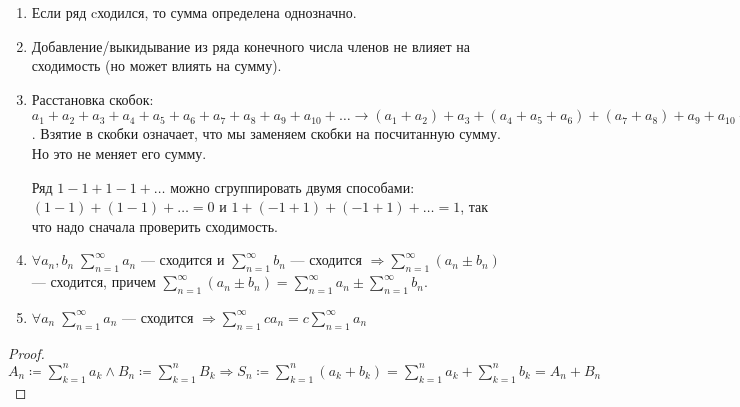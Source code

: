 \begin{enumerate}
    \item Если ряд cходился, то сумма определена однозначно.
    \item Добавление/выкидывание из ряда конечного числа членов не влияет на сходимость (но может влиять на сумму).
    \item Расстановка скобок: $a_1 + a_2 + a_3 + a_4 + a_5 + a_6 + a_7 + a_8 + a_9 + a_{10} + \ldots \to (a_1 + a_2) + a_3 + (a_4 + a_5 + a_6) + (a_7 + a_8) + a_9 + a_{10} + \ldots$. Взятие в скобки означает, что мы заменяем скобки на посчитанную сумму. Но это не меняет его сумму.
        \begin{remark}
            Ряд $1 -1 + 1 - 1 + \ldots$ можно сгруппировать двумя способами: $(1 - 1) + (1 - 1) + \ldots = 0$ и $1 + (-1 + 1) + (-1 + 1) + \ldots = 1$, так что надо сначала проверить сходимость.
        \end{remark}
    \item $\forall a_n, b_n \; \sum_{n=1}^\infty a_n$ --- сходится и $\sum_{n=1}^\infty b_n$ --- сходится $\Rightarrow \sum_{n=1}^\infty (a_n \pm b_n)$ --- сходится, причем  $\sum_{n=1}^\infty (a_n \pm b_n) = \sum_{n=1}^\infty a_n \pm \sum_{n=1}^\infty b_n$.
    \item $\forall a_n\; \sum_{n=1}^\infty a_n$ --- сходится $\Rightarrow \sum_{n=1}^\infty ca_n = c\sum_{n=1}^\infty a_n$
\end{enumerate}
\begin{proof}
    $A_n \coloneqq \sum_{k=1}^n a_k \land B_n \coloneqq \sum_{k=1}^n B_k \Rightarrow S_n \coloneqq \sum_{k=1}^n (a_k+b_k) = \sum_{k=1}^n a_k + \sum_{k=1}^n b_k = A_n + B_n$
\end{proof}
